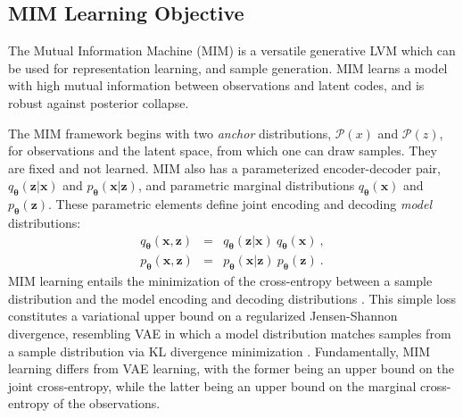 \documentclass{article}
\newcommand{\bs}{\boldsymbol}
\newcommand{\x}{{\bs{x}}}
\newcommand{\z}{{\bs z}}
\newcommand{\params}{{\bs \theta}}
\newcommand{\pjoint}{\mathcal{P}}
\newcommand{\pdec}{p}
\newcommand{\penc}{q}
\newcommand{\Mdec}{\pdec_{\params}}
\newcommand{\Menc}{\penc_{\params}}
\begin{document}
\subsection{MIM Learning Objective}
\label{sec:nlp-learning}

The Mutual Information Machine (MIM) \cite{2019arXiv191003175L} is a versatile generative LVM 
which can be used for representation learning, and sample generation.
MIM learns a model with high mutual information between observations and latent codes,
and is robust against posterior collapse. 

The MIM framework begins with two {\em anchor} distributions, $\pjoint(x)$ and $\pjoint(z)$, for
observations and the latent space, from which one can draw samples.  They are fixed and not learned.
MIM also has a parameterized encoder-decoder pair, $\Menc(\z|\x)$ and $\Mdec(\x|\z)$,
and parametric marginal distributions $\Menc(\x)$ and $\Mdec(\z)$.
These parametric elements define joint encoding and decoding {\em model} distributions:
\begin{eqnarray}
    \Menc(\x,\z) & = & \Menc(\z|\x)~ \Menc(\x) ~, \\
    \Mdec(\x,\z) & = & \Mdec(\x|\z)~\Mdec(\z) ~ .
\end{eqnarray}
MIM learning entails the minimization of the cross-entropy between a sample distribution 
and the model encoding and decoding distributions \citep{2019arXiv191003175L}. 
This simple loss constitutes a variational upper bound on a regularized Jensen-Shannon divergence, 
resembling VAE in which a model distribution matches samples from a sample distribution via KL 
divergence minimization \citep{Zhao_Song_Ermon_2018}. 
Fundamentally, MIM learning differs from VAE learning, with the former being an upper bound on the 
joint cross-entropy, while the latter being an upper bound on the marginal cross-entropy of the observations.
\end{document}
